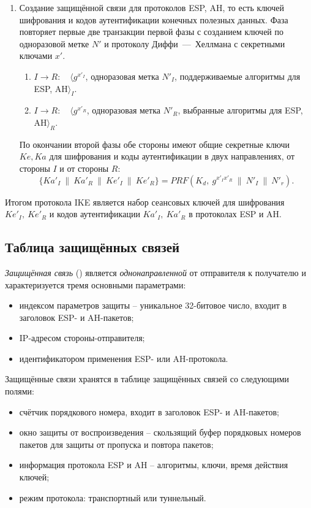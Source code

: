 \begin{enumerate}
    \item Создание защищённой связи для протоколов ESP, AH, то есть ключей шифрования и кодов аутентификации конечных полезных данных. Фаза повторяет первые две транзакции первой фазы с созданием ключей по одноразовой метке $N'$ и протоколу Диффи~---~Хеллмана с секретными ключами $x'$.
        \begin{enumerate}
            \item $I \rightarrow R$: ~ $\langle g^{x'_I}$, одноразовая метка $N'_I$, поддерживаемые алгоритмы для ESP, AH$\rangle_I$.
            \item $I \rightarrow R$: ~ $\langle g^{x'_R}$, одноразовая метка $N'_R$, выбранные алгоритмы для ESP, AH$\rangle_R$.
        \end{enumerate}
        По окончании второй фазы обе стороны имеют общие секретные ключи $Ke, Ka$ для шифрования и коды аутентификации в двух направлениях, от стороны $I$ и от стороны $R$:
            \[ \{Ka'_I ~\|~ Ka'_R ~\|~ Ke'_I ~\|~ Ke'_R \} = PRF(K_d, ~ g^{x'_I x'_R} ~\|~ N'_I ~\|~ N'_r). \]
\end{enumerate}

Итогом протокола IKE является набор сеансовых ключей для шифрования $Ke'_I, ~ Ke'_R$ и кодов аутентификации $Ka'_I, ~ Ka'_R$ в протоколах ESP и AH.


\subsection{Таблица защищённых связей}

\emph{Защищённая связь} () является \emph{однонаправленной} от отправителя к получателю и характеризуется тремя основными параметрами:
\begin{itemize}
    \item индексом параметров защиты -- уникальное 32-битовое число, входит в заголовок ESP- и AH-пакетов;
    \item IP-адресом стороны-отправителя;
    \item идентификатором применения ESP- или AH-протокола.
\end{itemize}

Защищённые связи хранятся в таблице защищённых связей со следующими полями:
\begin{itemize}
    \item счётчик порядкового номера, входит в заголовок ESP- и AH-пакетов;
    \item окно защиты от воспроизведения -- скользящий буфер порядковых номеров пакетов для защиты от пропуска и повтора пакетов;
    \item информация протокола ESP и AH -- алгоритмы, ключи, время действия ключей;
    \item режим протокола: транспортный или туннельный.
\end{itemize}

